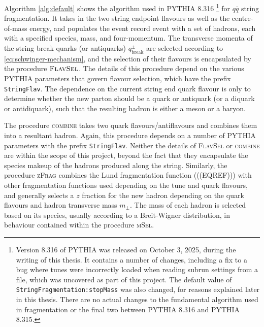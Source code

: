 \documentclass[12pt,a4paper]{report}
\begin{document}
Algorithm \ref{alg:default} shows the algorithm used in PYTHIA 8.316 \footnote{Version 8.316 of PYTHIA was released on October 3, 2025, during the writing of this thesis. It contains a number of changes, including a fix to a bug where tunes were incorrectly loaded when reading subrun settings from a file, which was uncovered as part of this project. The default value of \texttt{StringFragmentation:stopMass} was also changed, for reasons explained later in this thesis. There are no actual changes to the fundamental algorithm used in fragmentation or the final two between PYTHIA 8.316 and PYTHIA 8.315.} for $q\bar{q}$ string fragmentation. It takes in the two string endpoint flavours as well as the centre-of-mass energy, and populates the event record $\text{event}$ with a set of hadrons, each with a specified species, mass, and four-momentum. The transverse momenta of the string break quarks (or antiquarks) $q_\text{break}^\pm$ are selected according to \eqref{eq:schwinger-mechanism}, and the selection of their flavours is encapsulated by the procedure $\textsc{FlavSel}$. The details of this procedure depend on the various PYTHIA parameters that govern flavour selection, which have the prefix \texttt{StringFlav}. The dependence on the current string end quark flavour is only to determine whether the new parton should be a quark or antiquark (or a diquark or antidiquark), such that the resulting hadron is either a meson or a baryon.

The procedure \textsc{combine} takes two quark flavours/antiflavours and combines them into a resultant hadron. Again, this procedure depends on a number of PYTHIA parameters with the prefix \texttt{StringFlav}. Neither the details of \textsc{FlavSel} or \textsc{combine} are within the scope of this project, beyond the fact that they encapsulate the species makeup of the hadrons produced along the string. Similarly, the procedure \textsc{zFrag} combines the Lund fragmentation function (((EQREF))) with other fragmentation functions used depending on the tune and quark flavours, and generally selects a $z$ fraction for the new hadron depending on the quark flavours and hadron transverse mass $m_\perp$. The mass of each hadron is selected based on its species, usually according to a Breit-Wigner distribution, in behaviour contained within the procedure \textsc{mSel}.
\end{document}
